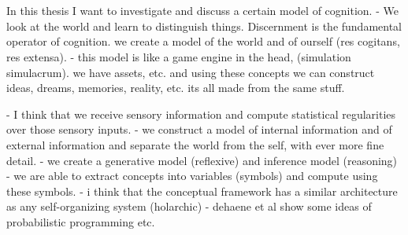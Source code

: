 \section{}

In this thesis I want to investigate and discuss a certain model of cognition.
- We look at the world and learn to distinguish things. Discernment is the fundamental operator of cognition.
we create a model of the world and of ourself (res cogitans, res extensa).
- this model is like a game engine in the head, (simulation simulacrum). we have assets, etc. and using these concepts we can construct ideas, dreams, memories, reality, etc. its all made from the same stuff.



- I think that we receive sensory information and compute statistical regularities over those sensory inputs. 
- we construct a model of internal information and of external information and separate the world from the self, with ever more fine detail. - we create a generative model (reflexive) and inference model (reasoning)
- we are able to extract concepts into variables (symbols) and compute using these symbols.
- i think that the conceptual framework has a similar architecture as any self-organizing system (holarchic)
- dehaene et al show some ideas of probabilistic programming etc. 










